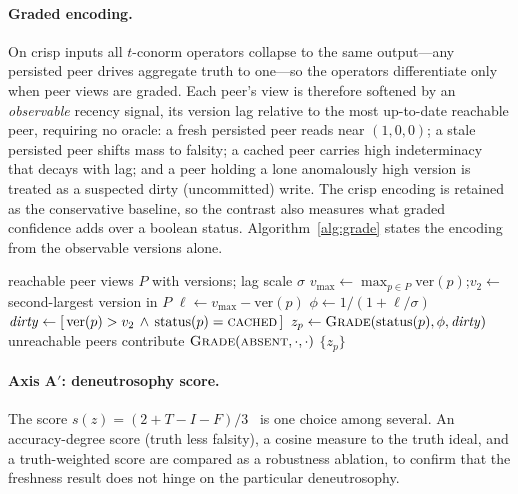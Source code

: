 \documentclass[11pt]{article}
\begin{document}
\paragraph{Graded encoding.} On crisp inputs all $t$-conorm operators collapse to the same output---any
persisted peer drives aggregate truth to one---so the operators differentiate only when peer views are
graded. Each peer's
view is therefore softened by an \emph{observable} recency signal, its version lag relative to the
most up-to-date reachable peer, requiring no oracle: a fresh persisted peer reads near $(1,0,0)$; a
stale persisted peer shifts mass to falsity; a cached peer carries high indeterminacy that decays with
lag; and a peer holding a lone anomalously high version is treated as a suspected dirty (uncommitted)
write. The crisp encoding is retained as the conservative baseline, so the contrast also measures what
graded confidence adds over a boolean status. Algorithm~\ref{alg:grade} states the encoding from the
observable versions alone.

\begin{algorithm}[t]
\caption{Graded confidence encoding from observable version lag}
\label{alg:grade}
\begin{algorithmic}[1]
\Require reachable peer views $P$ with versions; lag scale $\sigma$
\State $v_{\max}\gets \max_{p\in P}\mathrm{ver}(p)$;\quad $v_{2}\gets$ second-largest version in $P$
  \State $\ell \gets v_{\max}-\mathrm{ver}(p)$ 
  \State $\phi \gets 1/(1+\ell/\sigma)$ 
  \State $\mathit{dirty}\gets [\,\mathrm{ver}(p)>v_{2}\,\wedge\,\mathrm{status}(p)=\textsc{cached}\,]$ 
  \State $z_p\gets \textsc{Grade}(\mathrm{status}(p),\phi,\mathit{dirty})$ 
\EndFor
\State unreachable peers contribute $\textsc{Grade}(\textsc{absent},\cdot,\cdot)$
\State \Return $\{z_p\}$
\end{algorithmic}
\end{algorithm}

\paragraph{Axis A$'$: deneutrosophy score.} The score $s(z)=(2+T-I-F)/3$~\cite{ye2014score} is one
choice among several. An accuracy-degree score (truth less falsity), a cosine measure to the truth
ideal, and a truth-weighted score are compared as a robustness ablation, to confirm that the freshness
result does not hinge on the particular deneutrosophy.
\end{document}
